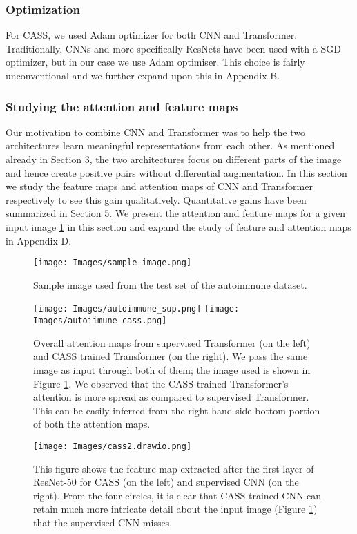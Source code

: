 \subsubsection{Optimization} For CASS, we used Adam optimizer for both CNN and Transformer. Traditionally, CNNs and more specifically ResNets have been used with a SGD optimizer, but in our case we use Adam optimiser. This choice is fairly unconventional and we further expand upon this in Appendix B.



\subsubsection{Studying the attention and feature maps}Our motivation to combine CNN and Transformer was to help the two architectures learn meaningful representations from each other. As mentioned already in Section 3, the two architectures focus on different parts of the image and hence create positive pairs without differential augmentation. In this section we study the feature maps and attention maps of CNN and Transformer respectively to see this gain qualitatively. Quantitative gains have been summarized in Section 5. We present the attention and feature maps for a given input image \ref{fig:main_sample_image} in this section and expand the study of feature and attention maps in Appendix D.

\begin{figure}
    \centering
    \texttt{[image: Images/sample\_image.png]}
\caption{Sample image used from the test set of the autoimmune dataset.}
    \label{fig:main_sample_image}
\end{figure}
\begin{figure}
    \centering
\texttt{[image: Images/autoimmune\_sup.png]}
    \texttt{[image: Images/autoiimune\_cass.png]}
    \caption{Overall attention maps from supervised Transformer (on the left) and CASS trained Transformer (on the right). We pass the same image as input through both of them; the image used is shown in Figure \ref{fig:main_sample_image}. We observed that the CASS-trained Transformer's attention is more spread as compared to supervised Transformer. This can be easily inferred from the right-hand side bottom portion of both the attention maps.}
    
    \label{fig:attnmapssingle}
\end{figure}
\begin{figure}[!ht]
    \centering
\texttt{[image: Images/cass2.drawio.png]}
    \caption{This figure shows the feature map extracted after the first layer of ResNet-50 for CASS (on the left) and supervised CNN (on the right). From the four circles, it is clear that CASS-trained CNN can retain much more intricate detail about the input image (Figure \ref{fig:main_sample_image}) that the supervised CNN misses.}
    
    \label{fig:fmapssingle}
\end{figure}

